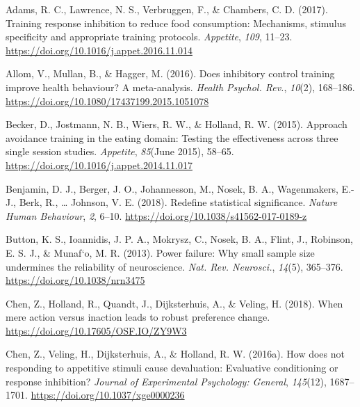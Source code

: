 \documentclass[man,floatsintext]{apa6}
\begin{document}
\begingroup
\setlength{\parindent}{-0.5in}
\setlength{\leftskip}{0.5in}

\hypertarget{refs}{}
\leavevmode\hypertarget{ref-adams_training_2017}{}%
Adams, R. C., Lawrence, N. S., Verbruggen, F., \& Chambers, C. D. (2017). Training response inhibition to reduce food consumption: Mechanisms, stimulus specificity and appropriate training protocols. \emph{Appetite}, \emph{109}, 11--23. \url{https://doi.org/10.1016/j.appet.2016.11.014}

\leavevmode\hypertarget{ref-allom_does_2016}{}%
Allom, V., Mullan, B., \& Hagger, M. (2016). Does inhibitory control training improve health behaviour? A meta-analysis. \emph{Health Psychol. Rev.}, \emph{10}(2), 168--186. \url{https://doi.org/10.1080/17437199.2015.1051078}

\leavevmode\hypertarget{ref-becker_approach_2015-1}{}%
Becker, D., Jostmann, N. B., Wiers, R. W., \& Holland, R. W. (2015). Approach avoidance training in the eating domain: Testing the effectiveness across three single session studies. \emph{Appetite}, \emph{85}(June 2015), 58--65. \url{https://doi.org/10.1016/j.appet.2014.11.017}

\leavevmode\hypertarget{ref-benjamin_redefine_2017}{}%
Benjamin, D. J., Berger, J. O., Johannesson, M., Nosek, B. A., Wagenmakers, E.-J., Berk, R., \ldots{} Johnson, V. E. (2018). Redefine statistical significance. \emph{Nature Human Behaviour}, \emph{2}, 6--10. \url{https://doi.org/10.1038/s41562-017-0189-z}

\leavevmode\hypertarget{ref-button_power_2013}{}%
Button, K. S., Ioannidis, J. P. A., Mokrysz, C., Nosek, B. A., Flint, J., Robinson, E. S. J., \& Munaf\a`o, M. R. (2013). Power failure: Why small sample size undermines the reliability of neuroscience. \emph{Nat. Rev. Neurosci.}, \emph{14}(5), 365--376. \url{https://doi.org/10.1038/nrn3475}

\leavevmode\hypertarget{ref-chen_when_2018}{}%
Chen, Z., Holland, R., Quandt, J., Dijksterhuis, A., \& Veling, H. (2018). When mere action versus inaction leads to robust preference change. \url{https://doi.org/10.17605/OSF.IO/ZY9W3}

\leavevmode\hypertarget{ref-chen_how_2016-1}{}%
Chen, Z., Veling, H., Dijksterhuis, A., \& Holland, R. W. (2016a). How does not responding to appetitive stimuli cause devaluation: Evaluative conditioning or response inhibition? \emph{Journal of Experimental Psychology: General}, \emph{145}(12), 1687--1701. \url{https://doi.org/10.1037/xge0000236}
\end{document}
